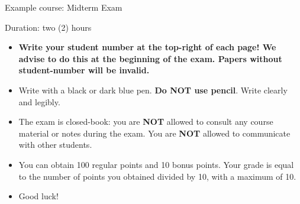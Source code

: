 \documentclass[answers]{exercises}
\begin{document}
\begin{center}
	{\LARGE Example course: Midterm Exam}

	\vspace{3mm}
	{\large Duration: two (2) hours}
\end{center}
\vspace{5mm}

\begin{instructions}
	\begin{itemize}
		\item \textbf{Write your student number at the top-right of each page! We advise to do this at the beginning of the exam. Papers without student-number will be invalid.}
		\item Write with a black or dark blue pen. \textbf{Do NOT use pencil}. Write clearly and legibly.
		\item The exam is {closed-book}: you are \textbf{NOT} allowed to consult any course material or notes during the exam.
		      You are \textbf{NOT} allowed to communicate with other students.
		\item You can obtain 100 regular points and 10 bonus points. Your grade is equal to the number of points you obtained divided by 10, with a maximum of 10.
		\item Good luck!
	\end{itemize}
\end{instructions}
\end{document}
